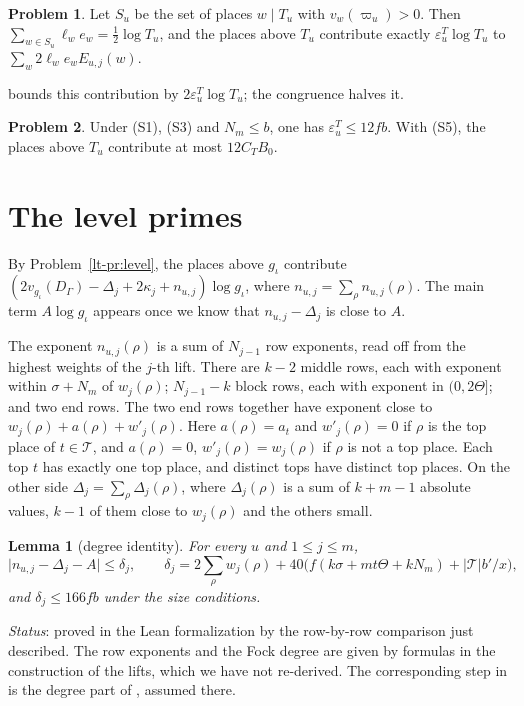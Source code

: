 \documentclass[reqno]{amsart}
\theoremstyle{definition}
\newtheorem{problem}{Problem}[section]
\theoremstyle{plain}
\newtheorem{lemma}[theorem]{Lemma}
\theoremstyle{remark}
\newcommand{\Tc}{\mathcal T}
\begin{document}
\begin{problem}\label{pr:seen-half}
Let \(S_u\) be the set of places \(w\mid T_u\) with \(v_w(\varpi_u)>0\).  Then \(\sum_{w\in S_u}\ell_we_w=\frac12\log T_u\), and the places above \(T_u\) contribute exactly \(\varepsilon^T_u\log T_u\) to \(\sum_w2\ell_we_wE_{u,j}(w)\).
\end{problem}

\cite[Thm.~16.6]{Adr} bounds this contribution by \(2\varepsilon^T_u\log T_u\); the congruence halves it.

\begin{problem}\label{pr:epsT}
Under (S1), (S3) and \(N_m\le b\), one has \(\varepsilon^T_u\le12fb\).  With (S5), the places above \(T_u\) contribute at most \(12C_TB_0\).
\end{problem}

\section{The level primes}\label{sec:level}

By Problem~\ref{lt-pr:level}, the places above \(g_\iota\) contribute \((2v_{g_\iota}(D_\Gamma)-\Delta_j+2\kappa_j+n_{u,j})\log g_\iota\), where \(n_{u,j}=\sum_\rho n_{u,j}(\rho)\).  The main term \(A\log g_\iota\) appears once we know that \(n_{u,j}-\Delta_j\) is close to \(A\).

The exponent \(n_{u,j}(\rho)\) is a sum of \(N_{j-1}\) row exponents, read off from the highest weights of the \(j\)-th lift.  There are \(k-2\) middle rows, each with exponent within \(\sigma+N_m\) of \(w_j(\rho)\); \(N_{j-1}-k\) block rows, each with exponent in \((0,2\Theta]\); and two end rows.  The two end rows together have exponent close to \(w_j(\rho)+a(\rho)+w'_j(\rho)\).  Here \(a(\rho)=a_t\) and \(w'_j(\rho)=0\) if \(\rho\) is the top place of \(t\in\Tc\), and \(a(\rho)=0\), \(w'_j(\rho)=w_j(\rho)\) if \(\rho\) is not a top place.  Each top \(t\) has exactly one top place, and distinct tops have distinct top places.  On the other side \(\Delta_j=\sum_\rho\Delta_j(\rho)\), where \(\Delta_j(\rho)\) is a sum of \(k+m-1\) absolute values, \(k-1\) of them close to \(w_j(\rho)\) and the others small.

\begin{lemma}[degree identity]\label{lem:degree}
For every \(u\) and \(1\le j\le m\),
\[
 \lvert n_{u,j}-\Delta_j-A\rvert\le\delta_j,\qquad
 \delta_j=2\sum_\rho w_j(\rho)+40\bigl(f(k\sigma+mt\Theta+kN_m)+\lvert\Tc\rvert b'/x\bigr),
\]
and \(\delta_j\le166fb\) under the size conditions.
\end{lemma}
\noindent\emph{Status}: proved in the Lean formalization by the row-by-row comparison just described.  The row exponents and the Fock degree are given by formulas in the construction of the lifts, which we have not re-derived.  The corresponding step in \cite{Adr} is the degree part of \cite[Hyp.~16.14]{Adr}, assumed there.
\end{document}
